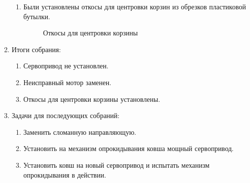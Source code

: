 \begin{enumerate}
\begin{enumerate}
	  \item Были установлены откосы для центровки корзин из обрезков пластиковой бутылки.
      \begin{figure}[H]
      	\begin{minipage}[h]{1\linewidth}
      		\caption{Откосы для центровки корзины}
      	\end{minipage}
      \end{figure}	
      
 	\end{enumerate}
 	\item Итоги собрания:
 	\begin{enumerate}
 		
 		\item Сервопривод не установлен.
 		
 		\item Неисправный мотор заменен.
 		
 		\item Откосы для центровки корзины установлены.
 		 
 	\end{enumerate}
 	\item Задачи для последующих собраний:
 	\begin{enumerate}
 		
 		\item Заменить сломанную направляющую.
 		
 		\item Установить на механизм опрокидывания ковша мощный сервопривод.
 		
 		\item Установить ковш на новый сервопривод и испытать механизм опрокидывания в действии.
 				
 	\end{enumerate}
\end{enumerate}
\fillpage